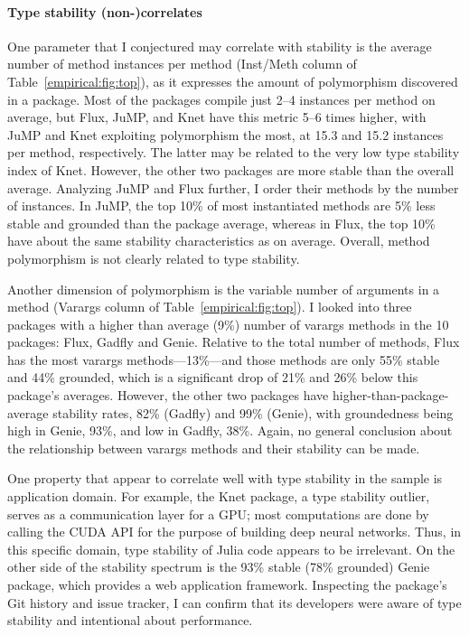 \paragraph{Type stability (non-)correlates}
One parameter that I conjectured may correlate with stability is the average
number of method instances per method (Inst/Meth column of
Table~\ref{empirical:fig:top}), as it expresses the amount of polymorphism
discovered in a package. Most of the packages compile just 2--4 instances per
method on average, but Flux, JuMP, and Knet have this metric 5--6 times higher,
with JuMP and Knet exploiting polymorphism the most, at 15.3 and 15.2
instances per method, respectively. The latter may be related to the very low type stability
index of Knet. However, the other two packages are more stable than the overall
average. Analyzing JuMP and Flux further, I order their methods by the number
of instances. In JuMP, the top 10\% of most instantiated methods are 5\% less
stable and grounded than the package average, whereas in Flux, the top 10\% have
about the same stability characteristics as on average. Overall,
method polymorphism is not clearly related to type stability.

Another dimension of polymorphism is the variable number of arguments in a
method (Varargs column of Table~\ref{empirical:fig:top}). I looked into three
packages with a higher than average (9\%) number of varargs methods in the 10
packages: Flux, Gadfly and Genie. Relative to the total number of methods, Flux has the most
varargs methods---13\%---and those methods are only 55\% stable and 44\%
grounded, which is a significant drop of 21\% and 26\% below this package's
averages. However, the other two packages have higher-than-package-average
stability rates, 82\% (Gadfly) and 99\% (Genie), with groundedness being high in
Genie, 93\%, and low in Gadfly, 38\%. Again, no general conclusion about the
relationship between varargs methods and their stability can be made.

One property that appear to correlate well with type stability in the sample is
application domain. For example, the Knet package, a type stability outlier,
serves as a communication layer for a GPU; most computations are done by calling
the CUDA API for the purpose of building deep neural networks. Thus, in this
specific domain, type stability of Julia code appears to be irrelevant. On the
other side of the stability spectrum is the 93\% stable (78\% grounded) Genie
package, which provides a web application framework. Inspecting the package's
Git history and issue tracker, I can confirm that its developers were aware of
type stability and intentional about performance.


